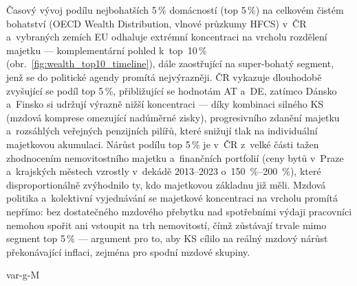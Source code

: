 Časový vývoj podílu nejbohatších 5\,\% domácností (top 5\,\%) na celkovém čistém bohatství (OECD Wealth Distribution, vlnové průzkumy HFCS) v~ČR a~vybraných zemích \ac{EU} odhaluje extrémní koncentraci na vrcholu rozdělení majetku --- komplementární pohled k~top~10\,\% (obr.~\ref{fig:wealth_top10_timeline}), dále zaostřující na super-bohatý segment, jenž se do politické agendy promítá nejvýrazněji.
ČR vykazuje dlouhodobě zvyšující se podíl top 5\,\%, přibližující se hodnotám AT a~DE, zatímco Dánsko a~Finsko si udržují výrazně nižší koncentraci --- díky kombinaci silného \ac{KS} (mzdová komprese omezující nadúměrné zisky), progresivního zdanění majetku a~rozsáhlých veřejných penzijních pilířů, které snižují tlak na individuální majetkovou akumulaci.
Nárůst podílu top 5\,\% je v~ČR z~velké části tažen zhodnocením nemovitostního majetku a~finančních portfolií (ceny bytů v~Praze a~krajských městech vzrostly v~dekádě 2013--2023 o~\SIrange{150}{200}{\percent}), které disproportionálně zvýhodnilo ty, kdo majetkovou základnu již měli.
Mzdová politika a~kolektivní vyjednávání se majetkové koncentraci na vrcholu promítá nepřímo: bez dostatečného mzdového přebytku nad spotřebními výdaji pracovníci nemohou spořit ani vstoupit na trh nemovitostí, čímž zůstávají trvale mimo segment top 5\,\% --- argument pro to, aby \ac{KS} cílilo na reálný mzdový nárůst překonávající inflaci, zejména pro spodní mzdové skupiny.

\acs{var-g-M}

